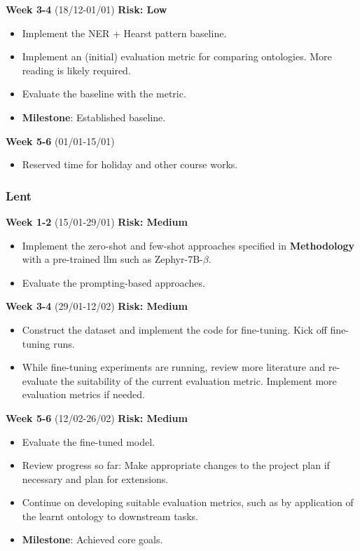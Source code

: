 \textbf{Week 3-4} (18/12-01/01) \hfill \textbf{Risk: Low}
\begin{itemize}
    \item Implement the NER + Hearst pattern baseline.
    \item Implement an (initial) evaluation metric for comparing ontologies. More reading is likely required.
    \item Evaluate the baseline with the metric.
    \item \textbf{Milestone}: Established baseline.
\end{itemize}

\textbf{Week 5-6} (01/01-15/01)
\begin{itemize}
    \item Reserved time for holiday and other course works.
\end{itemize}

\subsubsection*{Lent}
\textbf{Week 1-2} (15/01-29/01) \hfill \textbf{Risk: Medium}
\begin{itemize}
    \item Implement the zero-shot and few-shot approaches specified in \textbf{Methodology} with a pre-trained \gls{llm} such as Zephyr-7B-$\beta$.
    \item Evaluate the prompting-based approaches.
\end{itemize}

\textbf{Week 3-4} (29/01-12/02) \hfill \textbf{Risk: Medium}
\begin{itemize}
    \item Construct the dataset and implement the code for fine-tuning. Kick off fine-tuning runs.
    \item While fine-tuning experiments are running, review more literature and re-evaluate the suitability of the current evaluation metric. Implement more evaluation metrics if needed.
\end{itemize}

\textbf{Week 5-6} (12/02-26/02) \hfill \textbf{Risk: Medium}
\begin{itemize}
    \item Evaluate the fine-tuned model.
    \item Review progress so far: Make appropriate changes to the project plan if necessary and plan for extensions.
    \item Continue on developing suitable evaluation metrics, such as by application of the learnt ontology to downstream tasks.
    \item \textbf{Milestone}: Achieved core goals.
\end{itemize}

